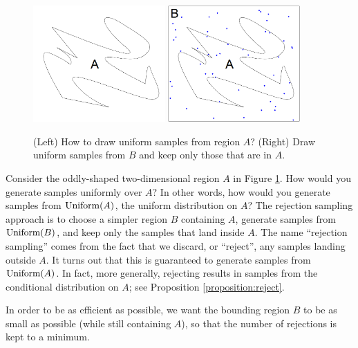 \documentclass[12pt]{article}
\begin{document}
\begin{figure}
  \begin{center}
    \includegraphics[width=0.45\textwidth]{reject-wo-samples.png}
    \hspace{0.05\textwidth}
    \includegraphics[width=0.45\textwidth]{reject-w-samples.png}
  \end{center}
  \caption{(Left) How to draw uniform samples from region $A$? (Right) Draw uniform samples from $B$ and keep only those that are in $A$.}
  \label{figure:reject}
\end{figure}

Consider the oddly-shaped two-dimensional region $A$ in Figure \ref{figure:reject}. How would you generate samples uniformly over $A$? In other words, how would you generate samples from $\operatorname*{Uniform}(A)$, the uniform distribution on $A$? The rejection sampling approach is to choose a simpler region $B$ containing $A$, generate samples from $\operatorname*{Uniform}(B)$, and keep only the samples that land inside $A$. The name ``rejection sampling'' comes from the fact that we discard, or ``reject'', any samples landing outside $A$.
It turns out that this is guaranteed to generate samples from $\operatorname*{Uniform}(A)$.
In fact, more generally, rejecting results in samples from the conditional distribution on $A$; see Proposition \ref{proposition:reject}.

In order to be as efficient as possible, we want the bounding region $B$ to be as small as possible (while still containing $A$), so that the number of rejections is kept to a minimum.
\end{document}
